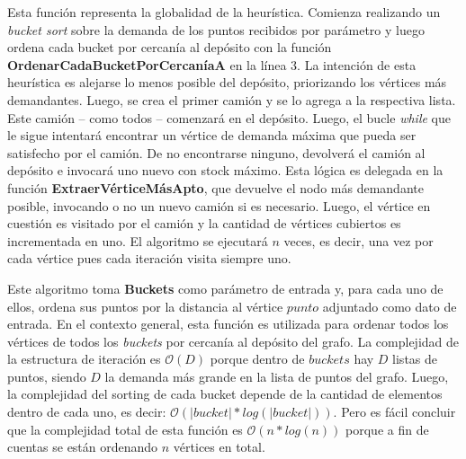 
Esta función representa la globalidad de la heurística. Comienza realizando un \textit{bucket sort} sobre la demanda de los puntos recibidos por parámetro y luego ordena cada bucket por cercanía al depósito con la función \textbf{OrdenarCadaBucketPorCercaníaA} en la línea 3. La intención de esta heurística es alejarse lo menos posible del depósito, priorizando los vértices más demandantes. Luego, se crea el primer camión y se lo agrega a la respectiva lista. Este camión – como todos – comenzará en el depósito. Luego, el bucle \textit{while} que le sigue intentará encontrar un vértice de demanda máxima que pueda ser satisfecho por el camión. De no encontrarse ninguno, devolverá el camión al depósito e invocará uno nuevo con stock máximo. Esta lógica es delegada en la función \textbf{ExtraerVérticeMásApto}, que devuelve el nodo más demandante posible, invocando o no un nuevo camión si es necesario. Luego, el vértice en cuestión es visitado por el camión y la cantidad de vértices cubiertos es incrementada en uno. El algoritmo se ejecutará $n$ veces, es decir, una vez por cada vértice pues cada iteración visita siempre uno.

\vskip 8pt



Este algoritmo toma \textbf{Buckets} como parámetro de entrada y, para cada uno de ellos, ordena sus puntos por la distancia al vértice $punto$ adjuntado como dato de entrada. En el contexto general, esta función es utilizada para ordenar todos los vértices de todos los \textit{buckets} por cercanía al depósito del grafo. La complejidad de la estructura de iteración es $\mathcal{O}(D)$ porque dentro de $buckets$ hay $D$ listas de puntos, siendo $D$ la demanda más grande en la lista de puntos del grafo. Luego, la complejidad del sorting de cada bucket depende de la cantidad de elementos dentro de cada uno, es decir: $\mathcal{O}(|bucket| * log(|bucket|))$. Pero es fácil concluir que la complejidad total de esta función es $\mathcal{O}(n * log(n))$ porque a fin de cuentas se están ordenando $n$ vértices en total.



